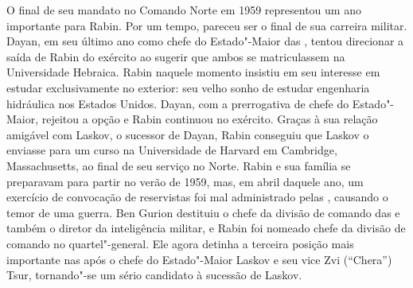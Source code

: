 O final de seu mandato no Comando Norte em 1959 representou um ano
importante para Rabin. Por um tempo, pareceu ser o final de sua carreira
militar. Dayan, em seu último ano como chefe do Estado"-Maior das ,
tentou direcionar a saída de Rabin do exército ao sugerir que
ambos se matriculassem na Universidade Hebraica. Rabin
naquele momento insistiu em seu interesse em estudar exclusivamente no
exterior: seu velho sonho de estudar engenharia hidráulica nos Estados Unidos.
Dayan, com a prerrogativa de chefe do Estado"-Maior, rejeitou a opção e
Rabin continuou no exército. Graças à sua relação amigável com Laskov, o
sucessor de Dayan, Rabin conseguiu que Laskov o enviasse para um curso
na Universidade de Harvard em Cambridge, Massachusetts, ao final de seu
serviço no Norte. Rabin e sua família se preparavam para partir no verão
de 1959, mas, em abril daquele ano, um exercício de convocação de
reservistas foi mal administrado pelas , causando o temor de uma
guerra. Ben Gurion destituiu o chefe da divisão de comando das  e também o
diretor da inteligência militar, e Rabin foi nomeado chefe da divisão de
comando no quartel"-general. Ele agora detinha a terceira posição mais
importante nas  após o chefe do Estado"-Maior Laskov e seu vice Zvi
(``Chera'') Tsur, tornando"-se um sério candidato à sucessão de Laskov.

